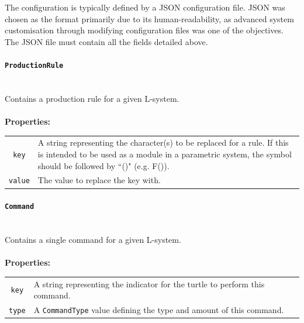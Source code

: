 \documentclass[12pt]{article}
\begin{document}
The configuration is typically defined by a JSON configuration file. JSON was chosen as the format primarily due to its human-readability, as advanced system customisation through modifying configuration files was one of the objectives. The JSON file must contain all the fields detailed above.
\paragraph{{\large\texttt{ProductionRule}}}\mbox{} \\
Contains a production rule for a given L-system.\\\\
\textbf{Properties: }
\begin{center}
\begin{tabular}{c p{12cm}}
\texttt{key}& A string representing the character(s) to be replaced for a rule. If this is intended to be used as a module in a parametric system, the symbol should be followed by ``()" (e.g. F()).\\
\texttt{value}& The value to replace the key with.\\
\end{tabular}
\end{center}

\paragraph{{\large\texttt{Command}}}\mbox{} \\
Contains a single command for a given L-system.\\\\
\textbf{Properties: }
\begin{center}
\begin{tabular}{c p{12cm}}
\texttt{key}& A string representing the indicator for the turtle to perform this command.\\
\texttt{type}& A \texttt{CommandType} value defining the type and amount of this command.\\
\end{tabular}
\end{center}
\pagebreak
\end{document}
